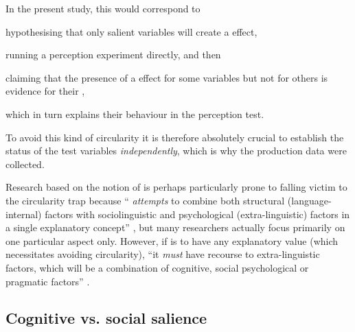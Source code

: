 In the present study, this would correspond to
\begin{inparaenum}[(1)]
	\item hypothesising that only salient variables will create a  effect,
	\item running a perception experiment directly, and then
	\item claiming that the presence of a  effect for some variables but not for others is evidence for their ,
	\item which in turn explains their behaviour in the perception test.
\end{inparaenum}
To avoid this kind of circularity it is therefore absolutely crucial to establish the  status of the test variables \emph{independently}, which is why the production data were collected.

\newpage 
Research based on the notion of  is perhaps particularly prone to falling victim to the circularity trap because `` \emph{attempts} to combine both structural (language-internal) factors with sociolinguistic and psychological (ex\-tra-linguistic) factors in a single explanatory concept'' \parencite[83, my emphasis]{kerswillwilliams2002}, but many researchers actually focus primarily on one particular aspect only.
However, if  is to have any explanatory value (which necessitates avoiding circularity), ``it \emph{must} have recourse to extra-linguistic factors, which will be a combination of cognitive, social psychological or pragmatic fac\-tors'' \parencite[83, my emphasis]{kerswillwilliams2002}.

		\subsection{Cognitive vs. social salience}
		\label{sec.sal.sal.cog}

